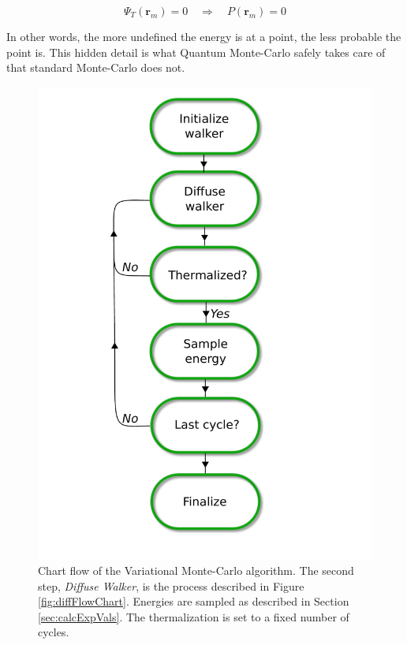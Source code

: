\begin{equation}
 \Psi_T(\mathbf{r}_m) = 0 \quad\Longrightarrow\quad P(\mathbf{r}_m) = 0
\end{equation}

In other words, the more undefined the energy is at a point, the less probable the point is. This hidden detail is what Quantum Monte-Carlo safely takes care of that standard Monte-Carlo does not. 

\begin{figure}
 \begin{center}
  \includegraphics[scale=0.65]{../Graphics/VMCUML.pdf}
  \caption{Chart flow of the Variational Monte-Carlo algorithm. The second step, \textit{Diffuse Walker}, is the process described in Figure \ref{fig:diffFlowChart}. Energies are sampled as described in Section \ref{sec:calcExpVals}. The thermalization is set to a fixed number of cycles. }
  \label{fig:VMCchart}
 \end{center}
\end{figure}
\clearpage

